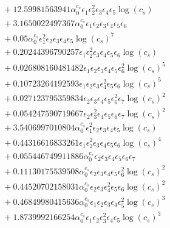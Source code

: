 \documentclass[10pt]{article}
\begin{document}
\begin{align*}
&{}  + 12.59981563941 \alpha_{0}^{c_s} \epsilon_{1} \epsilon_{2}^{2} \epsilon_{3} \epsilon_{4} \epsilon_{5} \log{\left(c_{s} \right)} \\
&{}  + 3.1650022497367 \alpha_{0}^{c_s} \epsilon_{1} \epsilon_{2} \epsilon_{3} \epsilon_{4} \epsilon_{5} \epsilon_{6} \\
&{}  + 0.05 \alpha_{0}^{c_s} \epsilon_{1}^{2} \epsilon_{2} \epsilon_{3} \epsilon_{4} \epsilon_{5} \log{\left(c_{s} \right)}^{7} \\
&{}  + 0.20244396790257 \epsilon_{1} \epsilon_{2}^{2} \epsilon_{3} \epsilon_{4} \epsilon_{5} \epsilon_{6} \log{\left(c_{s} \right)} \\
&{}  + 0.026808160481482 \epsilon_{1} \epsilon_{2} \epsilon_{3} \epsilon_{4} \epsilon_{5} \epsilon_{6}^{2} \log{\left(c_{s} \right)}^{5} \\
&{}  + 0.10723264192593 \epsilon_{1} \epsilon_{2} \epsilon_{3} \epsilon_{4}^{2} \epsilon_{5} \epsilon_{6} \log{\left(c_{s} \right)}^{5} \\
&{}  + 0.027123795359834 \epsilon_{2} \epsilon_{3} \epsilon_{4} \epsilon_{5} \epsilon_{6}^{2} \epsilon_{7} \log{\left(c_{s} \right)}^{2} \\
&{}  + 0.054247590719667 \epsilon_{2} \epsilon_{3}^{2} \epsilon_{4} \epsilon_{5} \epsilon_{6} \epsilon_{7} \log{\left(c_{s} \right)}^{2} \\
&{}  + 3.5406997010804 \alpha_{0}^{c_s} \epsilon_{1}^{2} \epsilon_{2} \epsilon_{3} \epsilon_{4} \epsilon_{5} \log{\left(c_{s} \right)} \\
&{}  + 0.44316616833261 \epsilon_{1} \epsilon_{2}^{2} \epsilon_{3} \epsilon_{4} \epsilon_{5} \epsilon_{6} \log{\left(c_{s} \right)}^{4} \\
&{}  + 0.055446749911886 \alpha_{0}^{c_s} \epsilon_{2} \epsilon_{3} \epsilon_{4} \epsilon_{5} \epsilon_{6} \epsilon_{7} \\
&{}  + 0.11130175539508 \alpha_{0}^{c_s} \epsilon_{2} \epsilon_{3} \epsilon_{4} \epsilon_{5} \epsilon_{6}^{2} \log{\left(c_{s} \right)}^{2} \\
&{}  + 0.44520702158031 \alpha_{0}^{c_s} \epsilon_{2} \epsilon_{3} \epsilon_{4}^{2} \epsilon_{5} \epsilon_{6} \log{\left(c_{s} \right)}^{2} \\
&{}  + 0.46849980415636 \alpha_{0}^{c_s} \epsilon_{1} \epsilon_{2} \epsilon_{3} \epsilon_{4} \epsilon_{5}^{2} \log{\left(c_{s} \right)}^{3} \\
&{}  + 1.8739992166254 \alpha_{0}^{c_s} \epsilon_{1} \epsilon_{2} \epsilon_{3}^{2} \epsilon_{4} \epsilon_{5} \log{\left(c_{s} \right)}^{3} \\

\end{align*}
\end{document}
